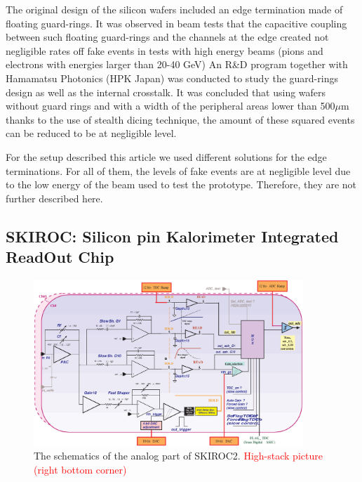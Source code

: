 \documentclass[a4paper,11pt]{article}
\newcommand{\todo}[1]{\textcolor{red}{{#1}}}
\begin{document}
The original design of the silicon wafers included an edge termination made of floating guard-rings.
It was observed in beam tests \cite{Cornat:2015eoa,Cornat:2009zz} that the capacitive coupling between such floating guard-rings 
and the channels at the edge created not negligible rates off fake
events in tests with high energy beams (pions and electrons with energies larger than 20-40 GeV)
An R\&D program together with Hamamatsu Photonics (HPK Japan) was conducted to study the guard-rings design 
as well as the internal crosstalk. It was concluded that using wafers without guard rings and with a width of the peripheral areas lower than 
500$\mu$m thanks to the use of stealth dicing technique, the amount of these squared events 
can be reduced to be at negligible level.

For the setup described this article we used different solutions for the edge terminations.
For all of them, the levels of fake events are at negligible level due to
the low energy of the beam used to test the prototype. Therefore, they are not further described here.

\subsection{SKIROC: Silicon pin Kalorimeter Integrated ReadOut Chip}
\label{sec:skiroc}

\begin{figure}[!ht]
  \centering
    \includegraphics[width=4in]{../figs/skiroc2_block.eps}
\caption{The schematics of the analog part of SKIROC2. \todo{High-stack picture (right bottom corner)}}
\label{SKIROC2}
\end{figure}
\end{document}
